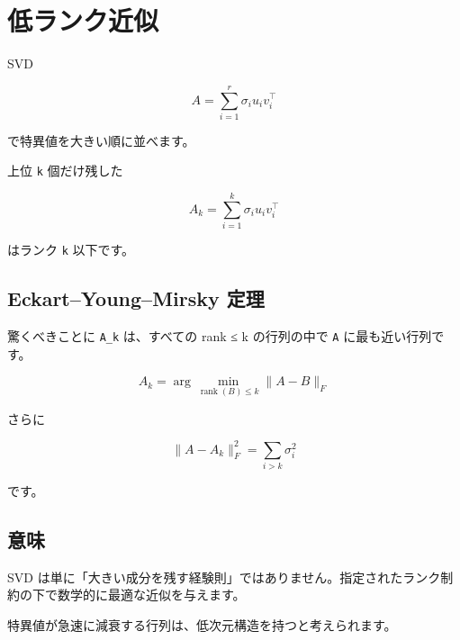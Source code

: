\documentclass[
  11pt,
  a4paper,
]{ltjsarticle}
\author{}
\date{}
\begin{document}
\hypertarget{ux4f4eux30e9ux30f3ux30afux8fd1ux4f3c}{%
\section{低ランク近似}\label{ux4f4eux30e9ux30f3ux30afux8fd1ux4f3c}}

SVD

\[
A=\sum_{i=1}^r\sigma_i u_i v_i^\top
\]

で特異値を大きい順に並べます。

上位 \texttt{k} 個だけ残した

\[
\boxed{A_k=\sum_{i=1}^k\sigma_i u_i v_i^\top}
\]

はランク \texttt{k} 以下です。

\hypertarget{eckartyoungmirsky-ux5b9aux7406}{%
\subsection{Eckart--Young--Mirsky
定理}\label{eckartyoungmirsky-ux5b9aux7406}}

驚くべきことに \texttt{A\_k} は、すべての rank ≤ k の行列の中で
\texttt{A} に最も近い行列です。

\[
A_k=\arg\min_{\operatorname{rank}(B)\le k}\|A-B\|_F
\]

さらに

\[
\|A-A_k\|_F^2=\sum_{i>k}\sigma_i^2
\]

です。

\hypertarget{ux610fux5473}{%
\subsection{意味}\label{ux610fux5473}}

SVD
は単に「大きい成分を残す経験則」ではありません。指定されたランク制約の下で数学的に最適な近似を与えます。

特異値が急速に減衰する行列は、低次元構造を持つと考えられます。
\end{document}
